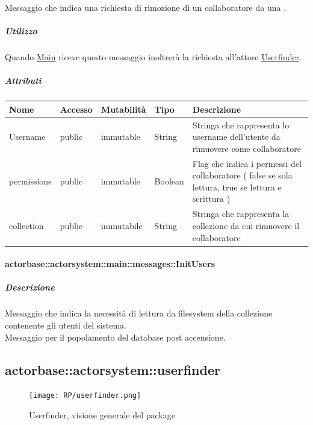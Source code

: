 \documentclass{scalatekids-article}
\begin{document}
Messaggio che indica una richiesta di rimozione di un collaboratore da una
.

\subparagraph{Utilizzo}

Quando \hyperref[sec:actorbase::actorsystem::main::Main]{Main}
riceve questo messaggio inoltrerà la richiesta all'attore \hyperref[sec:actorbase::actorsystem::userfinder::Userfinder]{Userfinder}.

\subparagraph{Attributi}
\begin{tabular}{| p{3cm} | p{1.5cm} | p{2cm} | p{2cm} | p{8.5cm} |}
  \hline
  Nome & Accesso & Mutabilità & Tipo & Descrizione\\
  \hline
  Username & public & immutable & String & Stringa che rappresenta lo username dell'utente da rimuovere come collaboratore\\
  \hline
  permissions & public & immutable & Boolean & Flag che indica i permessi del collaboratore ( false se sola lettura, true se lettura e scrittura )\\
  \hline
  collection & public & immutabile & String & Stringa che rappresenta la collezione da cui rimuovere il collaboratore\\
  \hline
\end{tabular}

\paragraph{actorbase::actorsystem::main::messages::InitUsers}
\label{sec:actorbase::actorsystem::main::messages::InitUsers}

\subparagraph{Descrizione}
Messaggio che indica la necessità di lettura da filesystem della collezione
contenente gli utenti del sistema.\\Messaggio per il popolamento del database
post accensione.


\subsection{actorbase::actorsystem::userfinder} %
\label{sec:actorbase::actorsystem::userfinder}

\begin{figure}[H]
  \begin{center}
    \texttt{[image: RP/userfinder.png]}
    \caption{Userfinder, visione generale del package}
  \end{center}
\end{figure}
\end{document}

